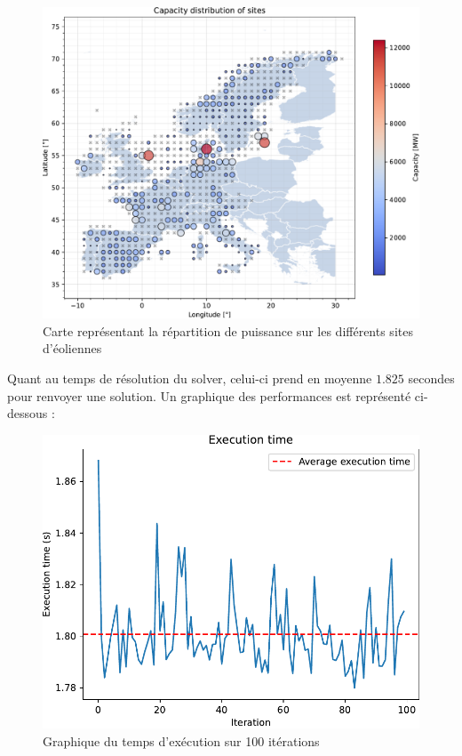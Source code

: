 \documentclass{article}
\newlength{\temp}
\begin{document}
\begin{figure}[h!]
    \centering
    \includegraphics[scale=0.4]{Images/Partie_1/Q1/capacity_distribution.pdf}
    \caption{Carte représentant la répartition de puissance sur les différents sites d'éoliennes}
    \label{fig:capacity_distribution_partie1}
\end{figure}

\newpage

Quant au temps de résolution du solver, celui-ci prend en moyenne $1.825$ secondes pour renvoyer une solution. Un graphique des performances est représenté ci-dessous :

\begin{figure}[h!]
    \centering
    \includegraphics[scale=0.5]{Images/Partie_1/Q1/execution_time.pdf}
    \caption{Graphique du temps d'exécution sur 100 itérations}
    \label{fig:execution_time_partie1}
\end{figure}
\end{document}
